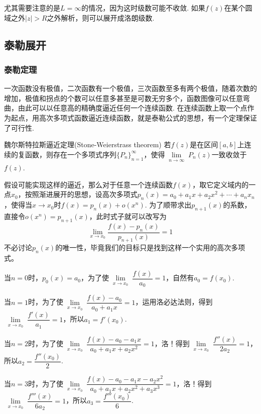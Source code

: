 \documentclass[main.tex]{subfiles}
\begin{document}
尤其需要注意的是\(L=\infty\)的情况，因为这时级数可能不收敛. 如果\(f(z)\)在某个圆域之外\(|z| > R\)之外解析，则可以展开成洛朗级数.

\subsection{泰勒展开}

\subsubsection{泰勒定理}

一次函数没有极值，二次函数有一个极值，三次函数至多有两个极值，随着次数的增加，极值和拐点的个数可以任意多甚至是可数无穷多个，函数图像可以任意弯曲，由此可以以任意高的精确度逼近任何一个连续函数. 在连续函数上取一个点作为起点，用高次多项式函数逼近连续函数，就是泰勒公式的思想，有一个定理保证了可行性.

\begin{theorem}{魏尔斯特拉斯逼近定理(Stone-Weierstrass theorem)}
    若\(f(z)\)是在区间\([a,b]\)上连续的复函数，则存在一个多项式序列\(\{P_n\}_{n=1}^{\infty}\)，使得\(\lim \limits_{\substack{n \to \infty}} P_n(z)\)一致收敛于\(f(z)\).
\end{theorem}

假设可能实现这样的逼近，那么对于任意一个连续函数\(f(x)\)，取它定义域内的一点\(x_0\)，按照渐进展开的思想，设高次多项式\(p_n(x)=a_0+a_1x+a_2x^2+\cdots+a_nx_n\)，使得当\(x \to x_0\)时\(f(x)=p_n(x)+o(x^n)\). 为了顺带求出\(p_{n+1}(x)\)的系数，直接令\(o(x^n)=p_{n+1}(x)\)，此时式子就可以改写为
\[\lim_{x \to x_0}\frac{f(x)-p_n(x)}{p_{n+1}(x)} = 1 \]
不必讨论\(p_n(x)\)的唯一性，毕竟我们的目标只是找到这样一个实用的高次多项式。

当\(n=0\)时，\(p_0(x)=a_0\)，为了使\(\lim \limits_{\substack{x\to x_0}}\dfrac{f(x)}{a_0}=1\)，自然有\(a_0=f(x_0)\).

当\(n=1\)时，为了使\(\lim \limits_{\substack{x\to x_0}}\dfrac{f(x)-a_0}{a_0+a_1x}=1\)，运用洛必达法则，得到\(\lim \limits_{\substack{x\to x_0}}\dfrac{f'(x)}{a_1}=1\)，所以\(a_1=f'(x_0)\).

当\(n=2\)时，为了使\(\lim \limits_{\substack{x\to x_0}}\dfrac{f(x)-a_0-a_1x}{a_0+a_1x+a_2x^2}=1\)，洛！得到\(\lim \limits_{\substack{x\to x_0}}\dfrac{f''(x)}{2a_2}=1\)，所以\(a_2=\dfrac{f''(x_0)}{2}\).

当\(n=3\)时，为了使\(\lim \limits_{\substack{x\to x_0}}\dfrac{f(x)-a_0-a_1x-a_2x^2}{a_0+a_1x+a_2x^2+a_3x^3}=1\)，洛！得到\(\lim \limits_{\substack{x\to x_0}}\dfrac{f'''(x)}{6a_2}=1\)，所以\(a_3=\dfrac{f'''(x_0)}{6}\).
\end{document}
